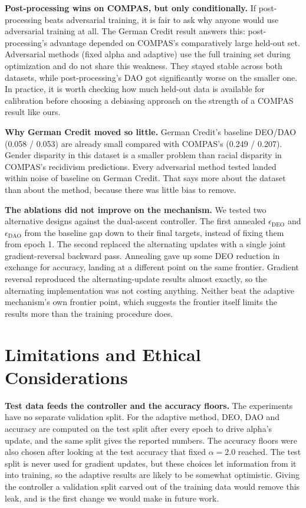 \documentclass[11pt]{article}
\begin{document}
\textbf{Post-processing wins on COMPAS, but only conditionally.} If
post-processing beats adversarial training, it is fair to ask why anyone
would use adversarial training at all. The German Credit result answers
this: post-processing's advantage depended on COMPAS's comparatively
large held-out set. Adversarial methods (fixed alpha and adaptive) use
the full training set during optimization and do not share this
weakness. They stayed stable across both datasets, while
post-processing's DAO got significantly worse on the smaller one. In
practice, it is worth checking how much held-out data is available for
calibration before choosing a debiasing approach on the strength of a
COMPAS result like ours.

\textbf{Why German Credit moved so little.} German Credit's baseline
DEO/DAO (0.058 / 0.053) are already small compared with COMPAS's (0.249
/ 0.207). Gender disparity in this dataset is a smaller problem than
racial disparity in COMPAS's recidivism predictions. Every adversarial
method tested landed within noise of baseline on German Credit. That
says more about the dataset than about the method, because there was
little bias to remove.

\textbf{The ablations did not improve on the mechanism.} We tested two
alternative designs against the dual-ascent controller. The first
annealed $\epsilon_{\text{DEO}}$ and $\epsilon_{\text{DAO}}$ from the
baseline gap down to their final targets, instead of fixing them from
epoch 1. The second replaced the alternating updates with a single joint
gradient-reversal backward pass. Annealing gave up some DEO reduction in
exchange for accuracy, landing at a different point on the same
frontier. Gradient reversal reproduced the alternating-update results
almost exactly, so the alternating implementation was not costing
anything. Neither beat the adaptive mechanism's own frontier point,
which suggests the frontier itself limits the results more than the
training procedure does.

\section{Limitations and Ethical Considerations}
\label{sec:limitations}

\textbf{Test data feeds the controller and the accuracy floors.} The
experiments have no separate validation split. For the adaptive method,
DEO, DAO and accuracy are computed on the test split after every epoch
to drive alpha's update, and the same split gives the reported numbers.
The accuracy floors were also chosen after looking at the test accuracy
that fixed $\alpha=2.0$ reached. The test split is never used for
gradient updates, but these choices let information from it into
training, so the adaptive results are likely to be somewhat optimistic.
Giving the controller a validation split carved out of the training data
would remove this leak, and is the first change we would make in future
work.
\end{document}
